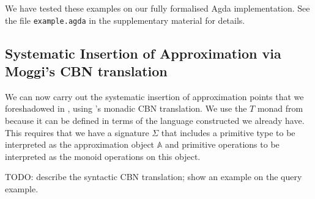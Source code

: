 We have tested these examples on our fully formalised Agda implementation. See the file \texttt{example.agda}
in the supplementary material for details.

\subsection{Systematic Insertion of Approximation via Moggi's CBN translation}
\label{sec:cbn-translation}

We can now carry out the systematic insertion of approximation points that we foreshadowed in
, using \citet[\S 3.1]{notions-of-computation}'s monadic CBN
translation. We use the $T$ monad from  because it can be defined in terms of the
language constructed we already have. This requires that we have a signature $\Sigma$ that includes a
primitive type to be interpreted as the approximation object $\mathbb{A}$ and primitive operations to be
interpreted as the monoid operations on this object.

TODO: describe the syntactic CBN translation; show an example on the query example.
